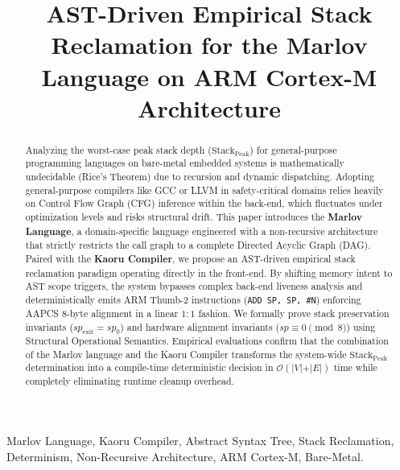 \documentclass[conference]{IEEEtran}
\begin{document}
\title{AST-Driven Empirical Stack Reclamation for the Marlov Language on ARM Cortex-M Architecture}

\author{
}

\maketitle

\begin{abstract}
Analyzing the worst-case peak stack depth ($\mathrm{Stack}_{\mathrm{Peak}}$) for general-purpose programming languages on bare-metal embedded systems is mathematically undecidable (Rice's Theorem) due to recursion and dynamic dispatching. Adopting general-purpose compilers like GCC or LLVM in safety-critical domains relies heavily on Control Flow Graph (CFG) inference within the back-end, which fluctuates under optimization levels and risks structural drift. This paper introduces the \textbf{Marlov Language}, a domain-specific language engineered with a non-recursive architecture that strictly restricts the call graph to a complete Directed Acyclic Graph (DAG). Paired with the \textbf{Kaoru Compiler}, we propose an AST-driven empirical stack reclamation paradigm operating directly in the front-end. By shifting memory intent to AST scope triggers, the system bypasses complex back-end liveness analysis and deterministically emits ARM Thumb-2 instructions (\texttt{ADD SP, SP, \#N}) enforcing AAPCS 8-byte alignment in a linear $1:1$ fashion. We formally prove stack preservation invariants ($sp_{\text{exit}} = sp_0$) and hardware alignment invariants ($sp \equiv 0 \pmod 8$) using Structural Operational Semantics. Empirical evaluations confirm that the combination of the Marlov language and the Kaoru Compiler transforms the system-wide $\mathrm{Stack}_{\mathrm{Peak}}$ determination into a compile-time deterministic decision in $\mathcal{O}(\vert{}V\vert{} + \vert{}E\vert{})$ time while completely eliminating runtime cleanup overhead.
\end{abstract}

\begin{IEEEkeywords}
Marlov Language, Kaoru Compiler, Abstract Syntax Tree, Stack Reclamation, Determinism, Non-Recursive Architecture, ARM Cortex-M, Bare-Metal.
\end{IEEEkeywords}
\end{document}
